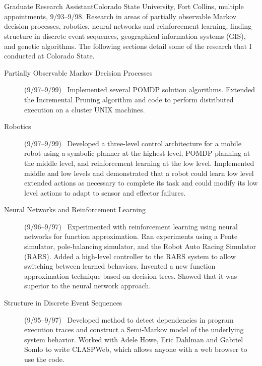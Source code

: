 \documentclass[11pt]{resume}
\begin{document}
\section{}
{Graduate Research Assistant}{Colorado State University, Fort Collins,
  multiple appointments, 9/93--9/98.  Research in areas of partially
  observable Markov decision processes, robotics, neural networks and
  reinforcement learning, finding structure in discrete event sequences,
  geographical information systems (GIS), and genetic algorithms.
 The following sections detail some of the research that 
  I conducted at Colorado State.}
      \begin{description}
      \item[Partially Observable Markov Decision
        Processes](9/97--9/99)
        \ Implemented several POMDP solution
        algorithms. 
        Extended  the Incremental Pruning algorithm and code to perform
        distributed execution on a cluster UNIX machines.
      \item[Robotics] (9/97--9/99)
        \ Developed a three-level control architecture for a mobile robot
        using a symbolic planner at the highest level, POMDP planning at
        the middle level, and reinforcement learning
        at the low level.  Implemented middle and low levels and
        demonstrated that a robot could learn low level
        extended actions
        as necessary to complete its task and could modify its low level
        actions to adapt to sensor  and effector failures.
      \item[Neural Networks and Reinforcement Learning](9/96--9/97)
        \ Experimented with reinforcement
        learning using neural networks for function
        approximation.  Ran experiments using a Pente simulator, pole-balancing
        simulator, and the Robot Auto Racing Simulator (RARS).  Added a 
        high-level controller to the RARS system to allow switching between
        learned behaviors.  Invented a new function approximation
        technique based on decision trees.  Showed that it was superior to
        the neural network approach.
      \item[Structure in Discrete Event Sequences](9/95--9/97)
        \ Developed method to detect dependencies in program execution traces
        and construct a Semi-Markov model of the underlying system behavior.
        Worked with Adele Howe, Eric Dahlman
        and Gabriel Somlo to write CLASPWeb, which allows anyone with a web
        browser to use the code. %

\end{description}
\end{document}
